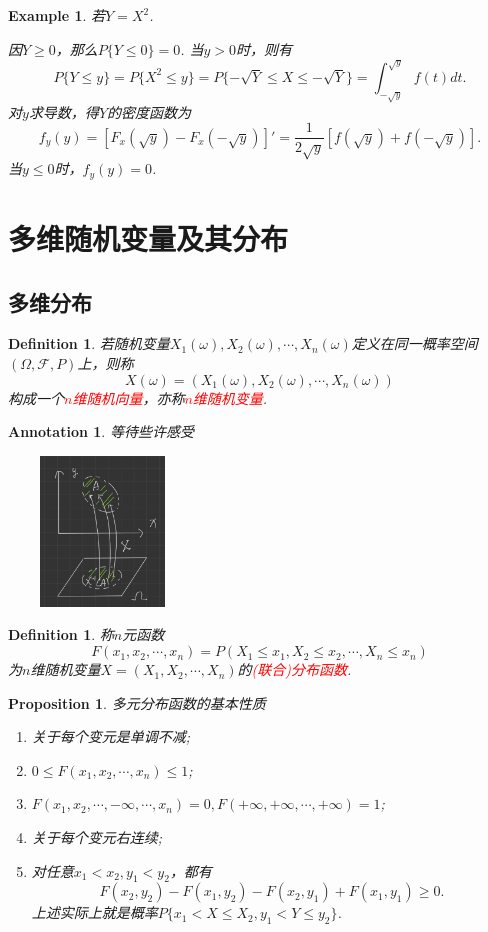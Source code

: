 \documentclass{article}
\newtheorem{proposition}[theorem]{Proposition}
\newtheorem{example}[theorem]{Example}
\newtheorem{definition}[theorem]{Definition}
\newtheorem{annotation}[theorem]{Annotation}
\newcommand{\redt}[1]{\textcolor{red}{#1}}
\begin{document}
\begin{example}
\rm 若$Y=X^2$.

因$Y \geq 0$，那么$P\{Y \leq 0\} = 0$. 当$y > 0$时，则有
$$
P\{Y \leq y\} = P\{X^2 \leq y\} = P\{-\sqrt{Y} \leq X \leq -\sqrt{Y}\} = \int_{-\sqrt{y}}^{\sqrt{y}} f(t)dt.
$$
对$y$求导数，得$Y$的密度函数为
$$
f_y(y) = [F_x(\sqrt{y})-F_x(-\sqrt{y})]' = \frac{1}{2\sqrt{y}}[f(\sqrt{y}) + f(-\sqrt{y})].
$$
当$y \leq 0$时，$f_y(y)=0$. 
\end{example}


\newpage
\section{多维随机变量及其分布}

\subsection{多维分布}
\begin{definition}
\rm 若随机变量$X_1(\omega),X_2(\omega),\cdots,X_n(\omega)$定义在同一概率空间$(\Omega,\mathscr{F},P)$上，则称
$$
X(\omega) = (X_1(\omega),X_2(\omega),\cdots,X_n(\omega))
$$
构成一个\redt{$n$维随机向量}，亦称\redt{$n$维随机变量}.
\end{definition}

\begin{annotation}
\rm 等待些许感受
\begin{center}
\includegraphics[width=5cm, height=4cm]{images/random_vector.jpg}
\end{center}
\end{annotation}

\begin{definition}
\rm 称$n$元函数
$$
F(x_1,x_2,\cdots,x_n) = P(X_1 \leq x_1, X_2 \leq x_2,\cdots, X_n \leq x_n)
$$
为$n$维随机变量$X=(X_1,X_2,\cdots,X_n)$的\redt{(联合)分布函数}. 
\end{definition}

\begin{proposition}
\rm 多元分布函数的基本性质
\begin{enumerate}
	\item 关于每个变元是单调不减;
	\item $0 \leq F(x_1,x_2,\cdots,x_n) \leq 1$;
	\item $F(x_1,x_2,\cdots,-\infty,\cdots,x_n) = 0,F(+\infty,+\infty,\cdots,+\infty) = 1$;
	\item 关于每个变元右连续;
	\item 对任意$x_1 < x_2, y_1 < y_2$，都有
	$$
	F(x_2,y_2)-F(x_1,y_2) - F(x_2,y_1) + F(x_1,y_1) \geq 0.
	$$
	上述实际上就是概率$P\{x_1 < X \leq X_2, y_1 < Y \leq y_2\}$.
\end{enumerate}
\end{proposition}
\end{document}
